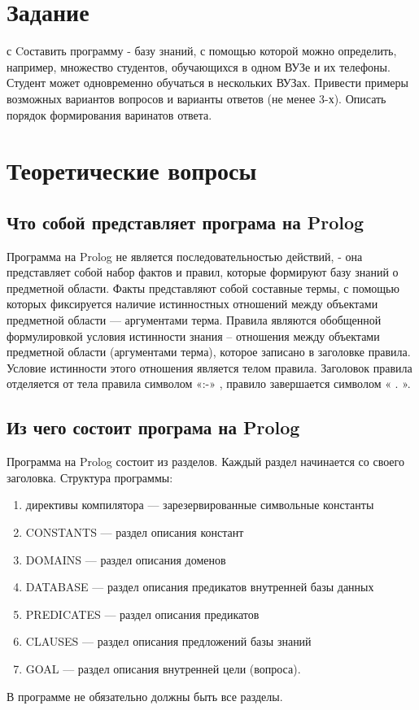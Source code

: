 \section{Задание} с
Cоставить программу - базу знаний, с помощью которой можно определить, например, множество студентов, обучающихся в одном ВУЗе и их телефоны. 
Студент может одновременно обучаться в нескольких ВУЗах. Привести примеры возможных вариантов вопросов и варианты ответов (не менее 3-х). 
Описать порядок формирования варинатов ответа.

\section{Теоретические вопросы}

\subsection{Что собой представляет програма на Prolog}

Программа на Prolog не является последовательностью действий, - она представляет собой набор фактов и 
правил, которые формируют базу знаний о предметной области. Факты представляют собой составные термы, 
с помощью которых фиксируется наличие истинностных отношений между объектами предметной области — аргументами 
терма. Правила являются обобщенной формулировкой условия истинности знания – отношения между объектами предметной 
области (аргументами терма), которое записано в заголовке правила. Условие истинности этого отношения является телом 
правила. Заголовок правила отделяется от тела правила символом «:-» , правило завершается символом « . ».

\subsection{Из чего состоит програма на Prolog}

Программа на Prolog состоит из разделов. Каждый раздел начинается со своего заголовка. Структура программы:

\begin{enumerate}
	\item директивы компилятора — зарезервированные символьные константы
	\item CONSTANTS — раздел описания констант
	\item DOMAINS — раздел описания доменов
	\item DATABASE — раздел описания предикатов внутренней базы данных
	\item PREDICATES — раздел описания предикатов
	\item CLAUSES — раздел описания предложений базы знаний
	\item GOAL — раздел описания внутренней цели (вопроса).
\end{enumerate}

В программе не обязательно должны быть все разделы.
